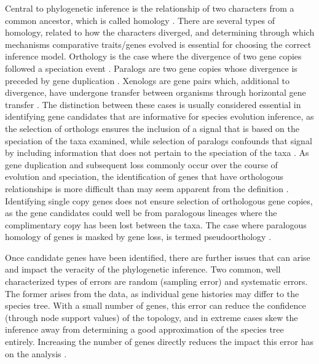 \documentclass[fleqn,10pt,lineno]{wlpeerj} %
\begin{document}
Central to phylogenetic inference is the relationship of two characters from a common ancestor, which is called homology \citep{fitch2000homology}. 
There are several types of homology, related to how the characters diverged, and determining through which mechanisms comparative traits/genes evolved is essential for choosing the correct inference model. 
Orthology is the case where the divergence of two gene copies followed a speciation event \citep{fitch1970distinguishing}. 
Paralogs are two gene copies whose divergence is preceded by gene duplication \citep{fitch1970distinguishing}.
Xenologs are gene pairs which, additional to divergence, have undergone transfer between organisms through horizontal gene transfer \citep{darby2016xenolog}.
The distinction between these cases is usually considered essential in identifying gene candidates that are informative for species evolution inference, as the selection of orthologs ensures the inclusion of a signal that is based on the speciation of the taxa examined, while selection of paralogs confounds that signal by including information that does not pertain to the speciation of the taxa \citep{du2019species}. 
As gene duplication and subsequent loss commonly occur over the course of evolution and speciation, the identification of genes that have orthologous relationships is more difficult than may seem apparent from the definition \citep{gabaldon2008large}. 
Identifying single copy genes does not ensure selection of orthologous gene copies, as the gene candidates could well be from paralogous lineages where the complimentary copy has been lost between the taxa. 
The case where paralogous homology of genes is masked by gene loss, is termed pseudoorthology \citep{koonin2005orthologs}. 


Once candidate genes have been identified, there are further issues that can arise and impact the veracity of the phylogenetic inference.
Two common, well characterized types of errors are random (sampling error) and systematic errors. 
The former arises from the data, as individual gene histories may differ to the species tree. 
With a small number of genes, this error can reduce the confidence (through node support values) of the topology, and in extreme cases skew the inference away from determining a good approximation of the species tree entirely. 
Increasing the number of genes directly reduces the impact this error has on the analysis \citep{philippe2004phylogenomics,heath2008taxon}. 
\end{document}
